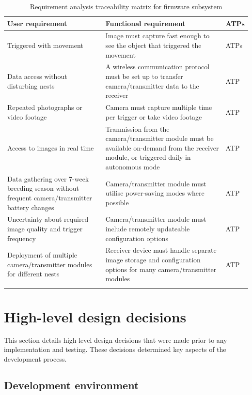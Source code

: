 \centering
\begin{longtable}{|p{}|p{}|p{}|}
    \hline
    \textbf{User requirement} & \textbf{Functional requirement} & \textbf{ATPs} \\ \hline
    Triggered with movement & Image must capture fast enough to see the object that triggered the movement & ATPs \\ \hline
    Data access without disturbing nests & A wireless communication protocol must be set up to transfer camera/transmitter data to the receiver & ATP \\ \hline
    Repeated photographs or video footage & Camera must capture multiple time per trigger or take video footage & ATP \\ \hline
    Access to images in real time & Tranmission from the camera/transmitter module must be available on-demand from the receiver module, or triggered daily in autonomous mode & ATP \\ \hline
    Data gathering over 7-week breeding season without frequent camera/transmitter battery changes & Camera/transmitter module must utilise power-saving modes where possible & ATP \\ \hline
    Uncertainty about required image quality and trigger frequency & Camera/transmitter module must include remotely updateable configuration options & ATP \\ \hline
    Deployment of multiple camera/transmitter modules for different nests & Receiver device must handle separate image storage and configuration options for many camera/transmitter modules & ATP \\ \hline
    \caption{Requirement analysis traceability matrix for firmware subsystem}
    \label{tab:firmware-requirements}
\end{longtable}
\raggedright


\section{High-level design decisions } \label{s:firmware-design-decisions}

This section details high-level design decisions that were made prior to any implementation and testing. These decisions determined key aspects of the development process.

\subsection{Development environment}


